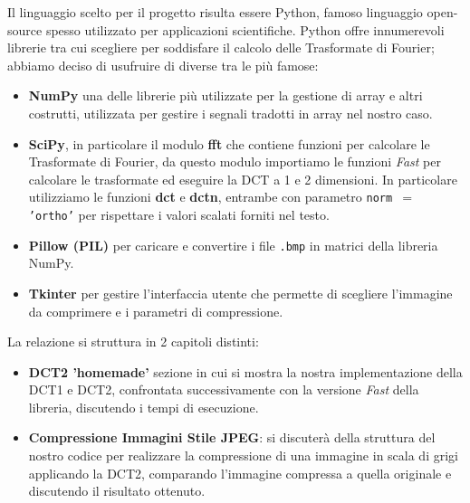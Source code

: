 Il linguaggio scelto per il progetto risulta essere Python, famoso linguaggio open-source spesso utilizzato per applicazioni scientifiche.
Python offre innumerevoli librerie tra cui scegliere per soddisfare il calcolo delle Trasformate di Fourier; abbiamo deciso di usufruire di diverse tra le più famose:
\begin{itemize}
	\item \textbf{NumPy} una delle librerie più utilizzate per la gestione di array e altri costrutti, utilizzata per gestire i segnali tradotti in array nel nostro caso.
	\item \textbf{SciPy}, in particolare il modulo \textbf{fft} che contiene funzioni per calcolare le Trasformate di Fourier, da questo modulo importiamo le funzioni \textit{Fast} per calcolare le trasformate ed eseguire la DCT a 1 e 2 dimensioni.
	In particolare utilizziamo le funzioni \textbf{dct} e \textbf{dctn}, entrambe con parametro \texttt{norm $=$ 'ortho'} per rispettare i valori scalati forniti nel testo.  
	\item \textbf{Pillow (PIL)} per caricare e convertire i file \texttt{.bmp} in matrici della libreria NumPy.
	\item \textbf{Tkinter} per gestire l'interfaccia utente che permette di scegliere l'immagine da comprimere e i parametri di compressione.
\end{itemize}

La relazione si struttura in 2 capitoli distinti:
\begin{itemize}
	\item \textbf{DCT2 'homemade'} sezione in cui si mostra la nostra implementazione della DCT1 e DCT2, confrontata successivamente con la versione \textit{Fast} della libreria, discutendo i tempi di esecuzione.
	\item \textbf{Compressione Immagini Stile JPEG}: si discuterà della struttura del nostro codice per realizzare la compressione di una immagine in scala di grigi applicando la DCT2, comparando l'immagine compressa a quella originale e discutendo il risultato ottenuto.
\end{itemize}